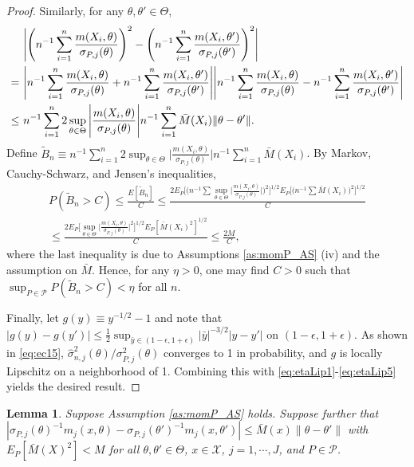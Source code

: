 \documentclass[letterpaper,11pt]{article}
\theoremstyle{myplain}
\newtheorem{lemma}{Lemma}[section]
\theoremstyle{mydefinition}
\theoremstyle{myremark}
\numberwithin{equation}{section}
\numberwithin{figure}{section}
\begin{document}
\begin{appendices}
\begin{proof}
Similarly, for any $\theta,\theta'\in\Theta$,
\begin{align}
&~\Bigg|\Bigg(n^{-1}\sum_{i=1}^n\frac{m(X_i,\theta)}{\sigma_{P,j}(\theta)}\Bigg)^2-\Bigg(n^{-1}\sum_{i=1}^n\frac{m(X_i,\theta')}{\sigma_{P,j}(\theta')}\Bigg)^2	\Bigg|\notag\\
=&~\Bigg|n^{-1}\sum_{i=1}^n\frac{m(X_i,\theta)}{\sigma_{P,j}(\theta)}+n^{-1}\sum_{i=1}^n\frac{m(X_i,\theta')}{\sigma_{P,j}(\theta')}\Bigg|\Bigg|n^{-1}\sum_{i=1}^n\frac{m(X_i,\theta)}{\sigma_{P,j}(\theta)}-n^{-1}\sum_{i=1}^n\frac{m(X_i,\theta')}{\sigma_{P,j}(\theta')}\Bigg|\notag\\
\le&~ n^{-1}\sum_{i=1}^n 2\sup_{\theta\in\Theta}\Bigg|\frac{m(X_i,\theta)}{\sigma_{P,j}(\theta)}\Bigg|n^{-1}\sum_{i=1}^n\bar M(X_i)\|\theta-\theta'\|.\label{eq:etaLip4}
\end{align}
Define $\tilde B_n\equiv n^{-1}\sum_{i=1}^n 2\sup_{\theta\in\Theta}\Big|\frac{m(X_i,\theta)}{\sigma_{P,j}(\theta)}\Big|n^{-1}\sum_{i=1}^n\bar M(X_i)$. By Markov, Cauchy-Schwarz, and Jensen's inequalities,
\begin{multline}
	P(\tilde B_n>C)\le \frac{E[\tilde B_n]}{C}\le \frac{2E_P\Big[\Big(n^{-1}\sum\sup_{\theta\in\Theta}\Big|\frac{m(X_i,\theta)}{\sigma_{P,j}(\theta)}\Big|\Big)^2\Big]^{1/2}E_P\Big[\Big(n^{-1}\sum\bar M(X_i)\Big)^2\Big]^{1/2}}{C} \\
\le \frac{2E_P\Big[\sup_{\theta\in\Theta}\big|\frac{m(X_i,\theta)}{\sigma_{P,j}(\theta)}\big|^2\Big]^{1/2}E_P[\bar M(X_i)^2]^{1/2}}{C}	\le \frac{2M}{C},\label{eq:etaLip5}
\end{multline}
where the last inequality is due to Assumptions \ref{as:momP_AS} (iv) and the assumption on $\bar M$.  Hence, for any $\eta>0$, one may find $C>0$ such that $\sup_{P\in\mathcal P}P(\tilde B_n>C)<\eta$ for all $n$.

Finally, let $g(y)\equiv y^{-1/2}-1$ and note that $|g(y)-g(y')|\le \frac{1}{2}\sup_{\bar y\in (1-\epsilon,1+\epsilon)}|\bar y|^{-3/2}|y-y'|$ on $(1-\epsilon,1+\epsilon).$ As shown in \eqref{eq:ec15}, $\hat\sigma^2_{n,j}(\theta)/\sigma^2_{P,j}(\theta)$ converges to 1 in probability, and $g$ is locally Lipschitz on a neighborhood of 1. Combining this with 
\eqref{eq:etaLip1}-\eqref{eq:etaLip5} yields the desired result.
\end{proof}

\begin{lemma}\label{lem:correl_Lip}
Suppose Assumption  \ref{as:momP_AS} holds.
Suppose further that $|\sigma_{P,j}(\theta)^{-1}m_j(x,\theta)-\sigma_{P,j}(\theta')^{-1}m_j(x,\theta')|\le \bar M(x)\|\theta-\theta'\|$ with $E_P[\bar M(X)^{2}]<M$  for all $\theta,\theta'\in\Theta$, $x\in\mathcal X$, $j=1,\cdots,J$, and $P\in\mathcal P$.


\end{lemma}
\end{appendices}
\end{document}
